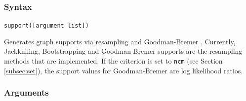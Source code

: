 	\subsubsection{Syntax}
		\texttt{support([argument list])}
		
	\begin{phygdescription}
		{Generates graph supports via resampling \citep{Farrisetal1996} and Goodman-Bremer  
		\citep{Goodmanetal1982, bremer1994}. Currently, Jackknifing, Bootstrapping and 
		Goodman-Bremer supports are the resampling methods that are implemented. If
		the criterion is set to \texttt{ncm} (see Section \ref{subsec:set}), the support values 
		for Goodman-Bremer are log likelihood ratios.}
	\end{phygdescription}
		
	\subsubsection{Arguments}
